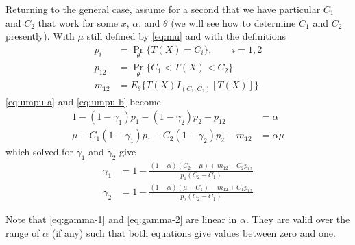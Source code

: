 \documentclass{article}
\DeclareMathOperator{\pr}{Pr}
\begin{document}
Returning to the general case, assume for a second that we have
particular $C_1$ and $C_2$ that work for some $x$, $\alpha$, and $\theta$
(we will see how to determine $C_1$ and $C_2$ presently).
With $\mu$ still defined by \eqref{eq:mu} and with the definitions
\begin{subequations}
\begin{align}
   p_i & = \pr_\theta\{ T(X) = C_i \}, \qquad i = 1, 2
   \label{eq:pi}
   \\
   p_{1 2} & = \pr_\theta\{ C_1 < T(X) < C_2 \}
   \label{eq:p12}
   \\
   m_{1 2} & = E_\theta\{ T(X) I_{(C_1, C_2)}[T(X)] \}
   \label{eq:m12}
\end{align}
\end{subequations}
\eqref{eq:umpu-a} and \eqref{eq:umpu-b} become
\begin{subequations}
\begin{align}
   1 - (1 - \gamma_1) p_1 - (1 - \gamma_2) p_2 - p_{1 2}
   & = \alpha
   \label{eq:umpu-a-general}
   \\
   \mu - C_1 (1 - \gamma_1) p_1 - C_2 (1 - \gamma_2) p_2 - m_{1 2}
   & = \alpha \mu
   \label{eq:umpu-b-general}
\end{align}
\end{subequations}
which solved for $\gamma_1$ and $\gamma_2$ give
\begin{subequations}
\begin{align}
   \gamma_1
   & =
   1 - \frac{(1 - \alpha) (C_2 - \mu) + m_{1 2} - C_2 p_{1 2}}{p_1 (C_2 - C_1)}
   \label{eq:gamma-1}
   \\
   \gamma_2
   & =
   1 - \frac{(1 - \alpha) (\mu - C_1) - m_{1 2} + C_1 p_{1 2}}{p_2 (C_2 - C_1)}
   \label{eq:gamma-2}
\end{align}
\end{subequations}

Note that \eqref{eq:gamma-1} and \eqref{eq:gamma-2} are linear in $\alpha$.
They are valid over the range of $\alpha$ (if any) such that both equations
give values between zero and one.
\end{document}

